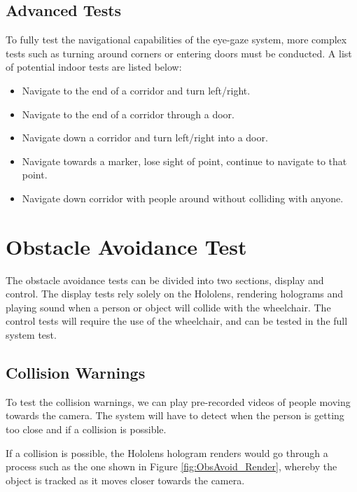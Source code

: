 \documentclass[12pt,a4paper]{report}
\begin{document}
\subsection{Advanced Tests} \label{section:Control_Advanced_Tests}
To fully test the navigational capabilities of the eye-gaze system, more complex tests such as turning around corners or entering doors must be conducted. A list of potential indoor tests are listed below:

\begin{itemize}
	\item Navigate to the end of a corridor and turn left/right.
	\item Navigate to the end of a corridor through a door.
	\item Navigate down a corridor and turn left/right into a door.
	\item Navigate towards a marker, lose sight of point, continue to navigate to that point.
	\item Navigate down corridor with people around without colliding with anyone.
\end{itemize}

\section{Obstacle Avoidance Test}
The obstacle avoidance tests can be divided into two sections, display and control. The display tests rely solely on the Hololens, rendering holograms and playing sound when a person or object will collide with the wheelchair. The control tests will require the use of the wheelchair, and can be tested in the full system test.

\subsection{Collision Warnings}
To test the collision warnings, we can play pre-recorded videos of people moving towards the camera. The system will have to detect when the person is getting too close and if a collision is possible. 

If a collision is possible, the Hololens hologram renders would go through a process such as the one shown in Figure \ref{fig:ObsAvoid_Render}, whereby the object is tracked as it moves closer towards the camera.
\end{document}
